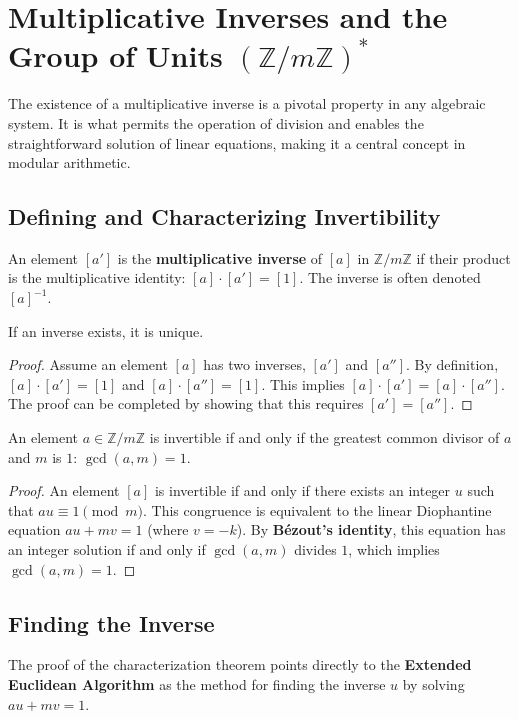 \section{Multiplicative Inverses and the Group of Units $(\mathbb{Z}/m\mathbb{Z})^*$}
The existence of a multiplicative inverse is a pivotal property in any algebraic system. It is what permits the operation of division and enables the straightforward solution of linear equations, making it a central concept in modular arithmetic.

\subsection{Defining and Characterizing Invertibility}
\begin{definition}
An element $[a']$ is the \textbf{multiplicative inverse} of $[a]$ in $\mathbb{Z}/m\mathbb{Z}$ if their product is the multiplicative identity: $[a] \cdot [a'] = [1]$. The inverse is often denoted $[a]^{-1}$.
\end{definition}

\begin{theorem}
If an inverse exists, it is unique.
\end{theorem}
\begin{proof}
Assume an element $[a]$ has two inverses, $[a']$ and $[a'']$. By definition, $[a] \cdot [a'] = [1]$ and $[a] \cdot [a''] = [1]$. This implies $[a] \cdot [a'] = [a] \cdot [a'']$. The proof can be completed by showing that this requires $[a'] = [a'']$.
\end{proof}

\begin{theorem}
An element $a \in \mathbb{Z}/m\mathbb{Z}$ is invertible if and only if the greatest common divisor of $a$ and $m$ is $1$: $\gcd(a, m) = 1$.
\end{theorem}
\begin{proof}
An element $[a]$ is invertible if and only if there exists an integer $u$ such that $au \equiv 1 \pmod{m}$. This congruence is equivalent to the linear Diophantine equation $au + mv = 1$ (where $v = -k$). By \textbf{Bézout's identity}, this equation has an integer solution if and only if $\gcd(a, m)$ divides $1$, which implies $\gcd(a, m) = 1$.
\end{proof}

\subsection{Finding the Inverse}
The proof of the characterization theorem points directly to the \textbf{Extended Euclidean Algorithm} as the method for finding the inverse $u$ by solving $au + mv = 1$.

